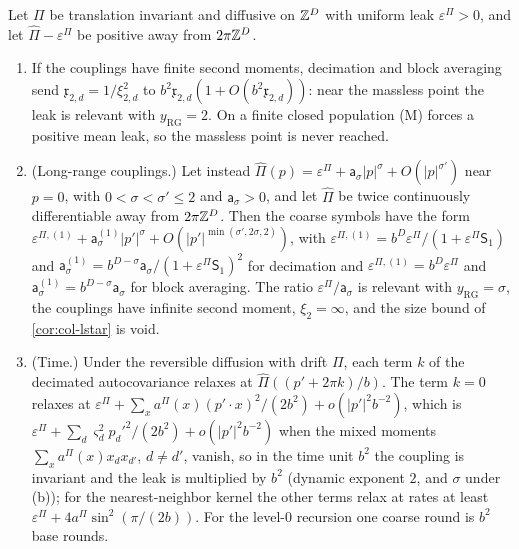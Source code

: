 \begin{proposition}\label{prop:ren-exponents}
Let $\Pi$ be translation invariant and diffusive on $\mathbb{Z}^D$ with uniform leak $\varepsilon^\Pi>0$, and let $\hat\Pi-\varepsilon^\Pi$ be positive away from $2\pi\mathbb{Z}^D$.
\begin{enumerate}
\item[(a)] If the couplings have finite second moments, decimation and block averaging send $\mathfrak x_{2,d}=1/\xi_{2,d}^2$ to $b^2\mathfrak x_{2,d}(1+O(b^2\mathfrak x_{2,d}))$: near the massless point the leak is relevant with $y_{\mathrm{RG}}=2$. On a finite closed population \textup{(M)} forces a positive mean leak, so the massless point is never reached.
\item[(b)] (Long-range couplings.) Let instead $\hat\Pi(p)=\varepsilon^\Pi+\mathsf a_\sigma\lvert p\rvert^\sigma+O(\lvert p\rvert^{\sigma'})$ near $p=0$, with $0<\sigma<\sigma'\le2$ and $\mathsf a_\sigma>0$, and let $\hat\Pi$ be twice continuously differentiable away from $2\pi\mathbb{Z}^D$. Then the coarse symbols have the form $\varepsilon^{\Pi,(1)}+\mathsf a^{(1)}_\sigma\lvert p'\rvert^\sigma+O(\lvert p'\rvert^{\min(\sigma',2\sigma,2)})$, with $\varepsilon^{\Pi,(1)}=b^D\varepsilon^\Pi/(1+\varepsilon^\Pi\mathsf S_1)$ and $\mathsf a^{(1)}_\sigma=b^{D-\sigma}\mathsf a_\sigma/(1+\varepsilon^\Pi\mathsf S_1)^2$ for decimation and $\varepsilon^{\Pi,(1)}=b^D\varepsilon^\Pi$ and $\mathsf a^{(1)}_\sigma=b^{D-\sigma}\mathsf a_\sigma$ for block averaging. The ratio $\varepsilon^\Pi/\mathsf a_\sigma$ is relevant with $y_{\mathrm{RG}}=\sigma$, the couplings have infinite second moment, $\xi_2=\infty$, and the size bound of \cref{cor:col-lstar} is void.
\item[(c)] (Time.) Under the reversible diffusion with drift $\Pi$, each term $k$ of the decimated autocovariance relaxes at $\hat\Pi((p'+2\pi k)/b)$. The term $k=0$ relaxes at $\varepsilon^\Pi+\sum_xa^\Pi(x)(p'\cdot x)^2/(2b^2)+o(\lvert p'\rvert^2b^{-2})$, which is $\varepsilon^\Pi+\sum_d\varsigma_d^2p_d'^2/(2b^2)+o(\lvert p'\rvert^2b^{-2})$ when the mixed moments $\sum_xa^\Pi(x)x_dx_{d'}$, $d\neq d'$, vanish, so in the time unit $b^2$ the coupling is invariant and the leak is multiplied by $b^2$ (dynamic exponent $2$, and $\sigma$ under (b)); for the nearest-neighbor kernel the other terms relax at rates at least $\varepsilon^\Pi+4a^\Pi\sin^2(\pi/(2b))$. For the level-0 recursion one coarse round is $b^2$ base rounds.
\end{enumerate}
\end{proposition}
